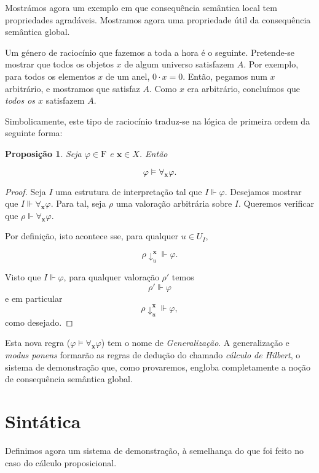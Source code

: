 \documentclass{report}
\newtheorem{prop}{Proposição}
\theoremstyle{definition}
\theoremstyle{remark}
\renewcommand{\bf}[1]{\mathbf{#1}}
\newcommand{\F}{\mathrm{F}}
\begin{document}
	\smallskip
	
	Mostrámos agora um exemplo em que consequência semântica local tem propriedades agradáveis. Mostramos agora uma propriedade útil da consequência semântica global.
	
	Um género de raciocínio que fazemos a toda a hora é o seguinte. Pretende-se mostrar que todos os objetos $x$ de algum universo satisfazem $A$. Por exemplo, para todos os elementos $x$ de um anel, $0 \cdot x = 0$. Então, pegamos num $x$ arbitrário, e mostramos que satisfaz $A$. Como $x$ era arbitrário, concluímos que \emph{todos os $x$} satisfazem $A$.
	
	Simbolicamente, este tipo de raciocínio traduz-se na lógica de primeira ordem da seguinte forma:
	
	\begin{prop}\label{fol:gen}
	Seja $\varphi \in \F$ e $\bf x \in X$. Então
	
	\[\varphi \vDash \forall_{\bf x} \varphi.\]
	\end{prop}
	
	\begin{proof}
	Seja $I$ uma estrutura de interpretação tal que $I \Vdash \varphi$. Desejamos mostrar que $I \Vdash \forall_{\bf x} \varphi$. Para tal, seja $\rho$ uma valoração arbitrária sobre $I$. Queremos verificar que $\rho \Vdash \forall_{\bf x} \varphi$.
	
	Por definição, isto acontece sse, para qualquer $u \in U_I$,
	
	\[\rho\!\downarrow^{\bf x}_u \Vdash \varphi.\]
	
	Visto que $I \Vdash \varphi$, para qualquer valoração $\rho'$ temos
	\[\rho' \Vdash \varphi\]
	e em particular
	\[\rho\!\downarrow^{\bf x}_u \Vdash \varphi,\]
	como desejado.
	\end{proof}
	
	Esta nova regra ($\varphi \vDash \forall_{\bf x} \varphi$) tem o nome de \emph{Generalização}. A generalização e \textit{modus ponens} formarão as regras de dedução do chamado \emph{cálculo de Hilbert}, o sistema de demonstração que, como provaremos, engloba completamente a noção de consequência semântica global.
	
	\section{Sintática}
	
	Definimos agora um sistema de demonstração, à semelhança do que foi feito no caso do cálculo proposicional.
	
\end{document}
